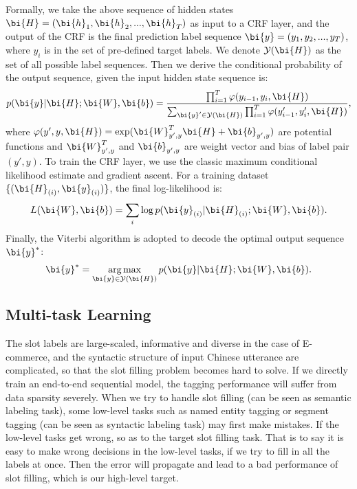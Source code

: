 Formally, we take the above sequence of hidden
states $\bi{H} = (\bi{h}_1, \bi{h}_2, ..., \bi{h}_T)$
as input to a CRF layer,
and the output of the CRF is the final prediction label sequence
$\bi{y} = (y_1, y_2, ..., y_T)$,
where $y_i$ is in the set of pre-defined target labels.
We denote $\mathcal{Y}(\bi{H})$ as the set of all possible label sequences.
Then we derive the conditional probability of the output sequence,
given the input hidden state sequence is:
\begin{equation*}
p(\bi{y}|\bi{H};\bi{W}, \bi{b})=\frac{\prod_{i=1}^{T}\varphi(y_{i-1},y_i,\bi{H})}
{\sum_{\bi{y}'\in\mathcal{Y}(\bi{H})}\prod_{i=1}^{T}\varphi(y'_{i-1},y'_i,\bi{H})},
\end{equation*}
where $\varphi(y',y,\bi{H})=\exp(\bi{W}_{y',y}^{T}\bi{H}+\bi{b}_{y',y})$ are potential functions and $\bi{W}_{y',y}^{T}$ and $\bi{b}_{y',y}$ are weight vector and bias of label pair $(y', y)$.
To train the CRF layer, we use the classic maximum
conditional likelihood estimate and gradient ascent.
For a training dataset $\{(\bi{H}_{(i)}, \bi{y}_{(i)})\}$, 
the final log-likelihood is:
\begin{equation*}
L(\bi{W},\bi{b}) = \sum_{i}\log p(\bi{y}_{(i)}|\bi{H}_{(i)};\bi{W},\bi{b}).
\end{equation*}
Finally, the Viterbi algorithm is adopted
to decode the optimal output sequence $\bi{y}^{*}$:
\begin{equation*}
\bi{y}^{*}=\mathop{\arg\max}_{\bi{y}\in\mathcal{Y}(\bi{H})}p(\bi{y}|\bi{H};\bi{W},\bi{b}).
\end{equation*}

\subsection{Multi-task Learning}
The slot labels are large-scaled, informative and diverse in the case of E-commerce,
and the syntactic structure of input Chinese utterance are complicated,
so that the slot filling problem becomes hard to solve.
If we directly train an end-to-end sequential model,
the tagging performance will suffer from data sparsity severely.
When we try to handle slot filling (can be seen as semantic labeling task),
some low-level tasks such as named entity tagging or segment tagging (can be seen as syntactic labeling task)
may first make mistakes.
If the low-level tasks get wrong, so as to the target slot filling task.
That is to say it is easy to make wrong decisions in the low-level tasks,
if we try to fill in all the labels at once.
Then the error will propagate and lead to a bad performance of slot filling, which is our high-level target.

